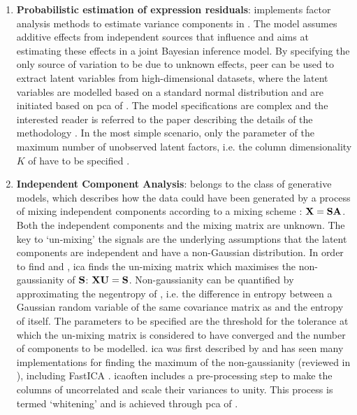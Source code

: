 \begin{enumerate}
\item\textbf{Probabilistic estimation of expression residuals}:  implements factor analysis methods to estimate variance components in . The model assumes additive effects from independent sources that influence  and aims at estimating these effects in a joint Bayesian inference model.  By specifying the only source of variation to be due to unknown effects, \gls{peer} can be used to extract latent variables from high-dimensional datasets, where the latent variables are modelled based on a standard normal distribution and are initiated based on \gls{pca} of . The model specifications are complex and the interested reader is referred to the paper describing the details of the methodology \citep{Stegle2010}. In the most simple scenario, only the parameter of the maximum number of unobserved latent factors, i.e. the column dimensionality \(K\) of  have to be specified \citep{Stegle2012}. 

\item\textbf{Independent Component Analysis}:   belongs to the class of generative models, which describes how the data  could have been generated by a process of mixing independent components  according to a mixing scheme : \(\boldsymbol{\mathbf{X}} = \boldsymbol{\mathbf{SA}}\). Both the independent components and the mixing matrix are unknown. The key to `un-mixing' the signals are the underlying assumptions that the latent components are independent and have a non-Gaussian distribution. In order to find  and , \gls{ica} finds the un-mixing matrix  which maximises the non-gaussianity of \(\boldsymbol{\mathbf{S}}\): \(\boldsymbol{\mathbf{XU}}=\boldsymbol{\mathbf{S}}\). Non-gaussianity can be quantified by approximating the negentropy of , i.e. the difference in entropy between a Gaussian random variable of the same covariance matrix as  and the entropy of  itself. The parameters to be specified are the threshold for the tolerance at which the un-mixing matrix is considered to have converged and the number of components to be modelled. \gls{ica} was first described by \citet{Herault1986} and has seen many implementations for finding the maximum of the non-gaussianity (reviewed in \citep{Comon1994}), including FastICA \citep{Hyvarinen2000}. \gls{ica}often includes a pre-processing step to make the columns of  uncorrelated and scale their variances to unity. This process is termed `whitening' and is achieved through \gls{pca} of . 


\end{enumerate}
